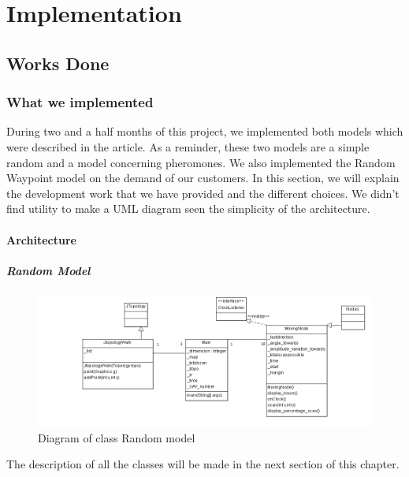 \part{Implementation}

\setcounter{chapter}{0}

\chapter{Works Done}

\section{What we implemented}

During two and a half months of this project, we implemented both models which were described in the article. As a reminder, these two models are a simple random and a model concerning pheromones. We also implemented the Random Waypoint model on the demand of our customers. In this section, we will explain the development work that we have provided and the different choices. We didn't find utility to make a UML diagram seen the simplicity of the architecture.

\subsection{Architecture}

\subsubsection{Random Model}

\begin{figure}[h]
\center
\includegraphics[scale=0.7]{../images/DiagrammedeclassesRandom.png}
\caption{\label{RandomWalkDIA}Diagram of class Random model}
\end{figure}

The description of all the classes will be made in the next section of this chapter.

